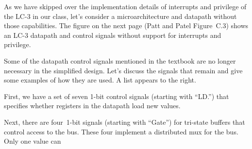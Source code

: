 As we have skipped over the implementation details of interrupts and 
privilege of the \mbox{LC-3} in our class, let's consider a 
microarchitecture and datapath without those capabilities.  
%
The figure on the next page (Patt and Patel Figure~C.3) shows an \mbox{LC-3}
datapath and control signals without support for interrupts and privilege.

\begin{minipage}{1.7in}
Some of the datapath control signals mentioned
in the textbook are no longer necessary in the simplified design.
%
Let's discuss the signals that remain and give some examples of how they
are used.  A list appears to the right.\mpline

First, we have a set of seven \mbox{1-bit} control signals (starting 
with ``LD.'') that specifies whether registers in the datapath load 
new values.\mpline

Next, there are four~\mbox{1-bit} signals (starting with ``Gate'') for 
tri-state buffers that control access to the bus.  These four implement 
a distributed mux for the bus.  Only one value can\linebreak
\end{minipage}\hspace{0.25in}%

